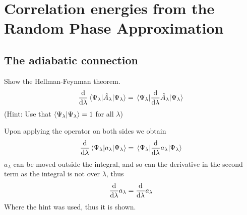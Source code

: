 \section{Correlation energies from the Random Phase Approximation}
\subsection{The adiabatic connection}
\begin{exercise}
Show the Hellman-Feynman theorem.
\begin{equation}
    \dv{\lambda}\mel{\Psi_{\lambda}}{\hat{A}_{\lambda}}{\Psi_{\lambda}} = \mel{\Psi_{\lambda}}{\dv{\lambda}\hat{A}_{\lambda}}{\Psi_{\lambda}}
\end{equation}
(Hint: Use that $\langle \Psi_{\lambda} | \Psi_{\lambda} \rangle=1$ for all $\lambda$) 
\end{exercise}

\begin{solution}
Upon applying the operator on both sides we obtain
\begin{equation}
        \dv{\lambda}\mel{\Psi_{\lambda}}{a_{\lambda}}{\Psi_{\lambda}} = \mel{\Psi_{\lambda}}{\dv{\lambda}a_{\lambda}}{\Psi_{\lambda}}
\end{equation}
$a_{\lambda}$ can be moved outside the integral, and so can the derivative in the second term as the integral is not over $\lambda$, thus
\begin{equation}
    \dv{\lambda} a_{\lambda} = \dv{\lambda} a_{\lambda}
\end{equation}
Where the hint was used, thus it is shown.
\end{solution}